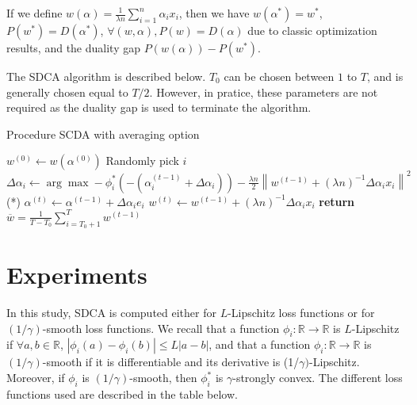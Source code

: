 \documentclass{article}
\newcommand{\abs}[1]{\left|#1\right|}
\newcommand{\norm}[1]{\left\|#1 \right\|}
\begin{document}
If we define $w(\alpha) = \frac{1}{\lambda n} \sum_{i=1}^n \alpha_ix_i$, then we have $w(\alpha^{*}) = w^{*}$, $P(w^{*}) = D(\alpha^{*})$, $\forall (w,\alpha), P(w) = D(\alpha)$ due to classic optimization results, and the duality gap $P(w(\alpha)) - P(w^{*})$.

The SDCA algorithm is described below.
$T_0$ can be chosen between $1$ to $T$, and is generally chosen equal to $T/2$.
However, in pratice, these parameters are not required as the duality gap is used to terminate the algorithm.

\begin{algorithm}
	\caption{Procedure SCDA with averaging option}
	\begin{algorithmic}
		\State $w^{(0)} \gets w(\alpha^{(0)})$
		\State Randomly pick $i$
		\State $\Delta \alpha_i \gets \arg \max -\phi^{*}_i(-(\alpha_i^{(t-1)}+\Delta \alpha_i))-\frac{\lambda n}{2}\norm{w^{(t-1)}+(\lambda n)^{-1}\Delta \alpha_i x_i}^2$ \qquad \qquad \qquad \qquad \qquad (*)
		\State $\alpha^{(t)} \gets \alpha^{(t-1)} + \Delta \alpha_i e_i$
		\State $w^{(t)} \gets w^{(t-1)} + (\lambda n)^{-1} \Delta \alpha_i x_i$
		\EndFor
		\State \textbf{return} $\overline{w} = \frac{1}{T-T_0} \sum_{i = T_0+1}^T w^{(t-1)}$
		\EndProcedure
	\end{algorithmic}
\end{algorithm}


\newpage
\section{Experiments}

In this study, SDCA is computed either for $L$-Lipschitz loss functions or for $(1/\gamma)$-smooth loss functions.
We recall that a function $\phi_i : \mathbb{R} \rightarrow \mathbb{R}$ is $L$-Lipschitz if $\forall a,b \in \mathbb{R}$, $\abs{\phi_i(a)-\phi_i(b)} \leq L \abs{a-b}$, and that a function $\phi_i : \mathbb{R} \rightarrow \mathbb{R}$ is $(1/\gamma)$-smooth if it is differentiable and its derivative is (1/$\gamma)$-Lipschitz.
Moreover, if $\phi_i$ is $(1/\gamma)$-smooth, then $\phi_i^{*}$ is $\gamma$-strongly convex.
The different loss functions used are described in the table below.
\end{document}
